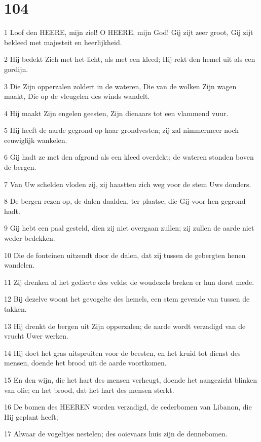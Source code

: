 \chapter{104}

\par 1 Loof den HEERE, mijn ziel! O HEERE, mijn God! Gij zijt zeer groot, Gij zijt bekleed met majesteit en heerlijkheid.
\par 2 Hij bedekt Zich met het licht, als met een kleed; Hij rekt den hemel uit als een gordijn.
\par 3 Die Zijn opperzalen zoldert in de wateren, Die van de wolken Zijn wagen maakt, Die op de vleugelen des winds wandelt.
\par 4 Hij maakt Zijn engelen geesten, Zijn dienaars tot een vlammend vuur.
\par 5 Hij heeft de aarde gegrond op haar grondvesten; zij zal nimmermeer noch eeuwiglijk wankelen.
\par 6 Gij hadt ze met den afgrond als een kleed overdekt; de wateren stonden boven de bergen.
\par 7 Van Uw schelden vloden zij, zij haastten zich weg voor de stem Uws donders.
\par 8 De bergen rezen op, de dalen daalden, ter plaatse, die Gij voor hen gegrond hadt.
\par 9 Gij hebt een paal gesteld, dien zij niet overgaan zullen; zij zullen de aarde niet weder bedekken.
\par 10 Die de fonteinen uitzendt door de dalen, dat zij tussen de gebergten henen wandelen.
\par 11 Zij drenken al het gedierte des velds; de woudezels breken er hun dorst mede.
\par 12 Bij dezelve woont het gevogelte des hemels, een stem gevende van tussen de takken.
\par 13 Hij drenkt de bergen uit Zijn opperzalen; de aarde wordt verzadigd van de vrucht Uwer werken.
\par 14 Hij doet het gras uitspruiten voor de beesten, en het kruid tot dienst des mensen, doende het brood uit de aarde voortkomen.
\par 15 En den wijn, die het hart des mensen verheugt, doende het aangezicht blinken van olie; en het brood, dat het hart des mensen sterkt.
\par 16 De bomen des HEEREN worden verzadigd, de cederbomen van Libanon, die Hij geplant heeft;
\par 17 Alwaar de vogeltjes nestelen; des ooievaars huis zijn de dennebomen.
